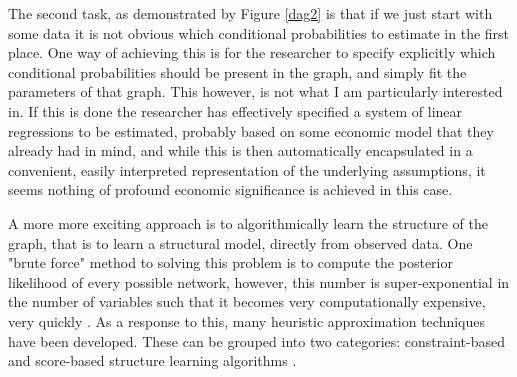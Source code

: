 \documentclass{article}
\begin{document}
The second task, as demonstrated by Figure \ref{dag2} is that if we just start with some data it is not obvious which conditional probabilities to estimate in the first place. One way of achieving this is for the researcher to specify explicitly which conditional probabilities should be present in the graph, and simply fit the parameters of that graph. This however, is not what I am particularly interested in. If this is done the researcher has effectively specified a system of linear regressions to be estimated, probably based on some economic model that they already had in mind, and while this is then automatically encapsulated in a convenient, easily interpreted representation of the underlying assumptions, it seems nothing of profound economic significance is achieved in this case. 

A more more exciting approach is to algorithmically learn the structure of the graph, that is to learn a structural model, directly from observed data. One "brute force" method to solving this problem is to compute the posterior likelihood of every possible network, however, this number is super-exponential in the number of variables such that it becomes very computationally expensive, very quickly \parencite{chickering1996learning}. As a response to this, many heuristic approximation techniques have been developed. These can be grouped into two categories: constraint-based and score-based structure learning algorithms \parencite{spirtes1991algorithm} \parencite{verma1991equivalence}. 
\end{document}
